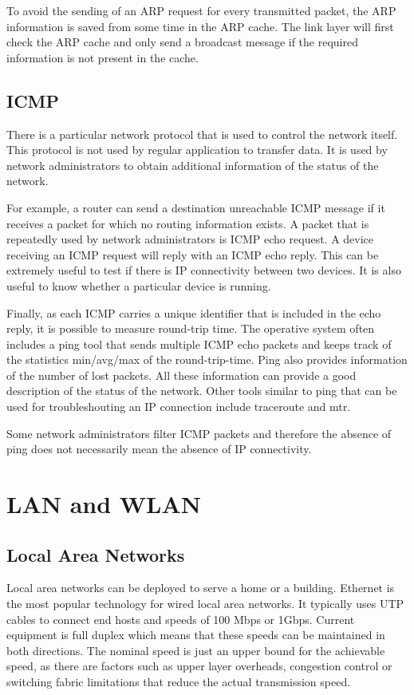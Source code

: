 To avoid the sending of an ARP request for every transmitted packet, the ARP information is saved from some time in the ARP cache.
The link layer will first check the ARP cache and only send a broadcast message if the required information is not present in the cache.


\subsection{ICMP}

There is a particular network protocol that is used to control the network itself.
This protocol is not used by regular application to transfer data. 
It is used by network administrators to obtain additional information of the status of the network.

For example, a router can send a destination unreachable ICMP message if it receives a packet for which no routing information exists.
A packet that is repeatedly used by network administrators is ICMP echo request.
A device receiving an ICMP request will reply with an ICMP echo reply.
This can be extremely useful to test if there is IP connectivity between two devices.
It is also useful to know whether a particular device is running.

Finally, as each ICMP carries a unique identifier that is included in the echo reply, it is possible to measure round-trip time.
The operative system often includes a ping tool that sends multiple ICMP echo packets and keeps track of the statistics min/avg/max of the round-trip-time.
Ping also provides information of the number of lost packets.
All these information can provide a good description of the status of the network.
Other tools similar to ping that can be used for troubleshouting an IP connection include traceroute and mtr.

Some network administrators filter ICMP packets and therefore the absence of ping does not necessarily mean the absence of IP connectivity.

\section{LAN and WLAN}

\subsection{Local Area Networks}

Local area networks can be deployed to serve a home or a building.
Ethernet is the most popular technology for wired local area networks.
It typically uses UTP cables to connect end hosts and speeds of 100 Mbps or 1Gbps.
Current equipment is full duplex which means that these speeds can be maintained in both directions.
The nominal speed is just an upper bound for the achievable speed, as there are factors such as upper layer overheads, congestion control or switching fabric limitations that reduce the actual transmission speed.

